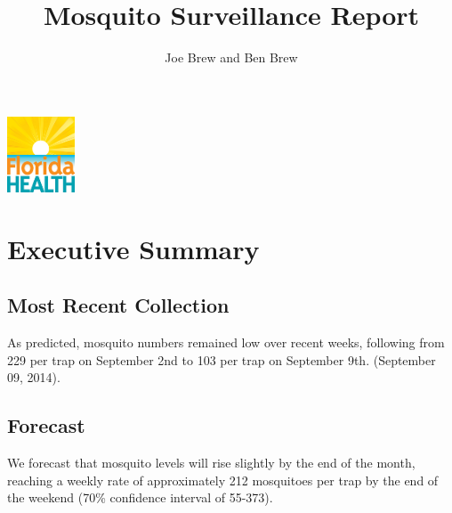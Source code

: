 \documentclass{article}
\begin{document}


\title{\textbf{Mosquito Surveillance Report}}
\author{Joe Brew and Ben Brew}


\maketitle
\tableofcontents

\vspace{40mm}

\begin{center}
\includegraphics[width=2cm]{doh}
\end{center}





\fancyhfoffset[E,O]{0pt}


\vspace*{30mm}
\section*{Executive Summary}
\hrulefill




\begin{multicols}{2} 


\subsection*{Most Recent Collection}

As predicted, mosquito numbers remained low over recent weeks, following from 229 per trap on September 2nd to 103 per trap on September 9th. (September 09, 2014).  

\vfill
\columnbreak



\subsection*{Forecast}

We forecast that mosquito levels will rise slightly by the end of the month, reaching a weekly rate of approximately 212 mosquitoes per trap by the end of the weekend (70\% confidence interval of 55-373). 



\end{multicols}
\end{document}
